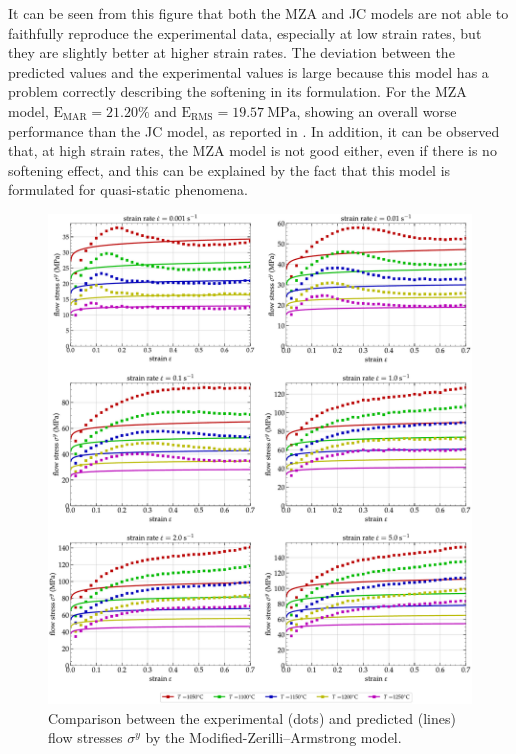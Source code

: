 \documentclass[metals,article,accept,pdftex,moreauthors]{Definitions/mdpi}
\DeclareRobustCommand{\RMSE}{\text{E}_\text{RMS}}
\DeclareRobustCommand{\MARE}{\text{E}_\text{MAR}}
\DeclareRobustCommand{\MPa}{\text{MPa}}
\begin{document}
It can be seen from this figure that both the MZA and JC models are not able to faithfully reproduce the experimental data, especially at low strain rates, but they are slightly better at higher strain rates.
The deviation between the predicted values and the experimental values is large because this model has a problem correctly describing the softening in its formulation.
For the MZA model, $\MARE=21.20\%$ and $\RMSE=19.57~\MPa$, showing an overall worse performance than the JC model, as reported in \cite{TizeMha-2022}.
In addition, it can be observed that, at high strain rates, the MZA model is not good either, even if there is no softening effect, and this can be explained by the fact that this model is formulated for quasi-static phenomena.


\begin{figure}[H]
\includegraphics[width=0.99\columnwidth]
{Figures/CompExp-MZA-6}
\caption{Comparison between the experimental (dots) and predicted (lines) flow stresses $\sigma^y$ by the Modified-Zerilli--Armstrong model.}
\label{fig:CompExp-MZA-6}
\end{figure}

\end{document}
